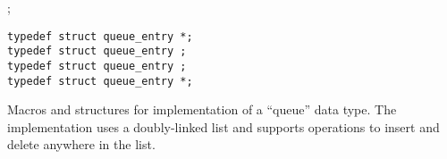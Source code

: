 
\begin{apisyn}

	;

	{\tt typedef struct queue_entry *;}\\
	{\tt typedef struct queue_entry ;}\\
	{\tt typedef struct queue_entry ;}\\
	{\tt typedef struct queue_entry *;}
\end{apisyn}
\begin{apidesc}
	Macros and structures for implementation of a ``queue'' data type.
	The implementation uses a doubly-linked list and supports
	operations to insert and delete anywhere in the list.


\end{apidesc}
